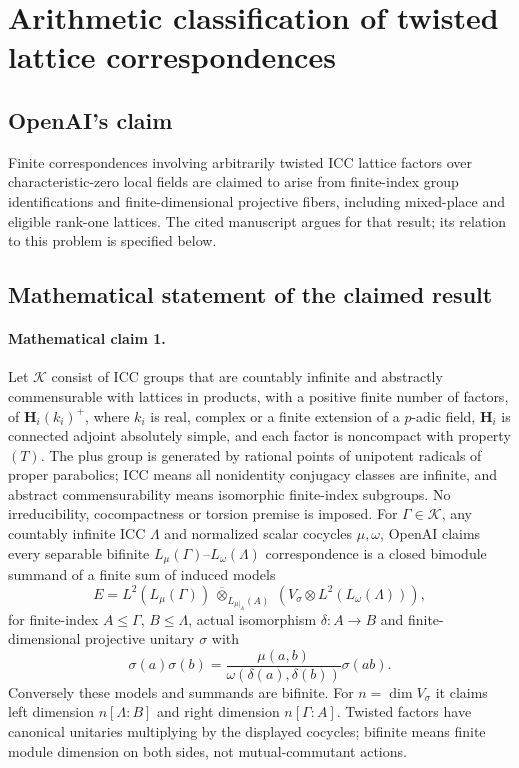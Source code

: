 \documentclass[11pt]{article}
\begin{document}
\section*{Arithmetic classification of twisted lattice correspondences}

\subsection{OpenAI's claim}
Finite correspondences involving arbitrarily twisted ICC lattice factors over characteristic-zero local fields are claimed to arise from finite-index group identifications and finite-dimensional projective fibers, including mixed-place and eligible rank-one lattices. The cited manuscript argues for that result; its relation to this problem is specified below.

\subsection{Mathematical statement of the claimed result}
\paragraph{Mathematical claim 1.} Let $\mathscr K$ consist of ICC groups that are countably infinite and abstractly commensurable with lattices in products, with a positive finite number of factors, of $\mathbf H_i(k_i)^+$, where $k_i$ is real, complex or a finite extension of a $p$-adic field, $\mathbf H_i$ is connected adjoint absolutely simple, and each factor is noncompact with property $(T)$. The plus group is generated by rational points of unipotent radicals of proper parabolics; ICC means all nonidentity conjugacy classes are infinite, and abstract commensurability means isomorphic finite-index subgroups. No irreducibility, cocompactness or torsion premise is imposed. For $\Gamma\in\mathscr K$, any countably infinite ICC $\Lambda$ and normalized scalar cocycles $\mu,\omega$, OpenAI claims every separable bifinite $L_\mu(\Gamma)$--$L_\omega(\Lambda)$ correspondence is a closed bimodule summand of a finite sum of induced models
\[
E=L^2(L_\mu(\Gamma))\ \overline\otimes_{L_{\mu|_A}(A)}\ (V_\sigma\otimes L^2(L_\omega(\Lambda))),
\]
for finite-index $A\le\Gamma$, $B\le\Lambda$, actual isomorphism $\delta:A\to B$ and finite-dimensional projective unitary $\sigma$ with
\[
\sigma(a)\sigma(b)=\frac{\mu(a,b)}{\omega(\delta(a),\delta(b))}\sigma(ab).
\]
Conversely these models and summands are bifinite. For $n=\dim V_\sigma$ it claims left dimension $n[\Lambda:B]$ and right dimension $n[\Gamma:A]$. Twisted factors have canonical unitaries multiplying by the displayed cocycles; bifinite means finite module dimension on both sides, not mutual-commutant actions.
\end{document}

